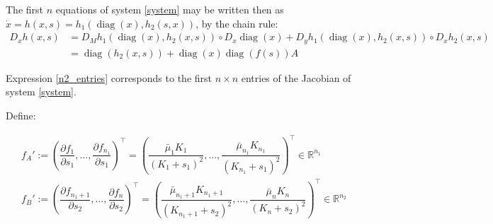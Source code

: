 \documentclass[3p,times]{article}
\newcommand{\R}{\mathbb{R}}
\DeclareMathOperator{\diag}{diag}
\begin{document}
The first $n$ equations of system \eqref{system} may be written then as $\dot{x} =  h(x,s) = h_1(\diag(x), h_2(s,x))$, by the chain rule: 
\begin{align} D_xh(x,s) &= D_M h_1(\diag(x),h_2(x,s))\circ D_x \diag (x) + D_yh_1(\diag(x),h_2(x,s))\circ D_xh_2(x,s)  \\ &=
\diag(h_2(x,s))+\diag(x)\diag(f(s))A  \label{n2_entries}
\end{align}

Expression \eqref{n2_entries} corresponds to the first $n\times n$ entries of the Jacobian of system \eqref{system}.

Define:

\begin{align*}
f_A' := \left( \dfrac{\partial f_1}{\partial s_1}, \dots, \dfrac{\partial f_{n_1}}{\partial s_1} \right)^\top = \left(\dfrac{\bar{\mu}_1K_1}{(K_1 + s_1)^2},\dots, \dfrac{\bar{\mu}_{n_1}K_{n_1}}{(K_{n_1} + s_1)^2} \right)^\top \in \R^{n_1} \\
f_B' := \left( \dfrac{\partial f_{n_1+1}}{\partial s_2}, \dots, \dfrac{\partial f_{n}}{\partial s_2} \right)^\top = \left( \dfrac{\bar{\mu}_{n_1+1}K_{n_1+1}}{(K_{n_1+1} + s_2)^2},\dots, \dfrac{\bar{\mu}_{n}K_{n}}{(K_{n} + s_2)^2} \right)^\top \in \R^{n_2}
\end{align*}
\end{document}
